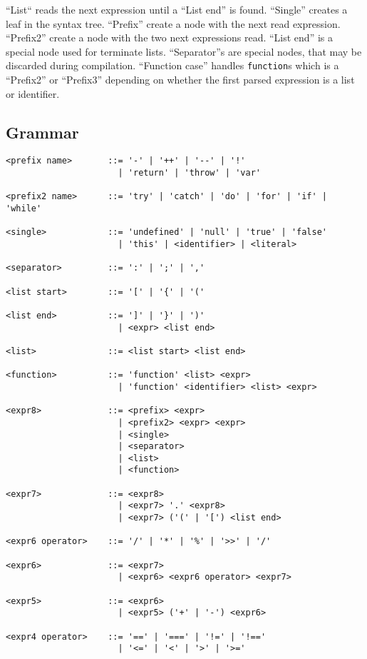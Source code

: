 ``List`` reads the next expression until a ``List end'' is found. ``Single'' creates a leaf in the syntax tree. ``Prefix'' create a node with the next read expression. ``Prefix2'' create a node with the two next expressions read. ``List end'' is a special node used for terminate lists. ``Separator''s are special nodes, that may be discarded during compilation. ``Function case'' handles \verb|function|s which is a ``Prefix2'' or ``Prefix3'' depending on whether the first parsed expression is a list or identifier. 

\subsection{Grammar}
\begin{verbatim}
<prefix name>       ::= '-' | '++' | '--' | '!' 
                      | 'return' | 'throw' | 'var' 

<prefix2 name>      ::= 'try' | 'catch' | 'do' | 'for' | 'if' | 'while'

<single>            ::= 'undefined' | 'null' | 'true' | 'false'
                      | 'this' | <identifier> | <literal>

<separator>         ::= ':' | ';' | ','

<list start>        ::= '[' | '{' | '('

<list end>          ::= ']' | '}' | ')'
                      | <expr> <list end>

<list>              ::= <list start> <list end>

<function>          ::= 'function' <list> <expr>
                      | 'function' <identifier> <list> <expr>

<expr8>             ::= <prefix> <expr>
                      | <prefix2> <expr> <expr>
                      | <single>
                      | <separator>
                      | <list>
                      | <function>

<expr7>             ::= <expr8>
                      | <expr7> '.' <expr8>
                      | <expr7> ('(' | '[') <list end>

<expr6 operator>    ::= '/' | '*' | '%' | '>>' | '/'

<expr6>             ::= <expr7>
                      | <expr6> <expr6 operator> <expr7>

<expr5>             ::= <expr6>
                      | <expr5> ('+' | '-') <expr6>

<expr4 operator>    ::= '==' | '===' | '!=' | '!==' 
                      | '<=' | '<' | '>' | '>='


\end{verbatim}
